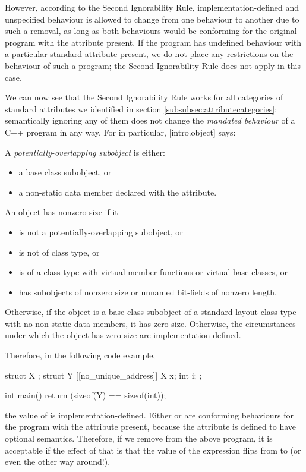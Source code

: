 However, according to the Second Ignorability Rule, implementation-defined and unspecified behaviour is allowed to change from one behaviour to another due to such a removal, as long as both behaviours would be conforming for the original program with the attribute present. If the program has undefined behaviour with a particular standard attribute present, we do not place any restrictions on the behaviour of such a program; the Second Ignorability Rule does not apply in this case.

We can now see that the Second Ignorability Rule works for all categories of standard attributes we identified in section \ref{subsubsec:attributecategories}: semantically ignoring any of them does not change the \emph{mandated behaviour} of a C++ program in any way. For  in particular, [intro.object] says:
\begin{adjustwidth}{0.5cm}{0.5cm}
A \emph{potentially-overlapping subobject} is either:
\begin{itemize}
\item a base class subobject, or
\item a non-static data member declared with the  attribute.
\end{itemize}
An object has nonzero size if it
\begin{itemize}
\item is not a potentially-overlapping subobject, or
\item is not of class type, or
\item is of a class type with virtual member functions or virtual base classes, or
\item has subobjects of nonzero size or unnamed bit-fields of nonzero length.
\end{itemize}
Otherwise, if the object is a base class subobject of a standard-layout class type with no non-static data members, it has zero size. Otherwise, the circumstances under which the object has zero size are implementation-defined. 
\end{adjustwidth}

Therefore, in the following code example,
\begin{codeblock}
struct X {};
struct Y {
  [[no_unique_address]] X x;
  int i; 
};

int main() { 
  return (sizeof(Y) == sizeof(int)); 
}
\end{codeblock}

the value of  is implementation-defined. Either  or  are conforming behaviours for the program with the  attribute present, because the attribute is defined to have optional semantics. Therefore, if we remove  from the above program, it is acceptable if the effect of that is that the value of the expression flips from  to  (or even the other way around!).

